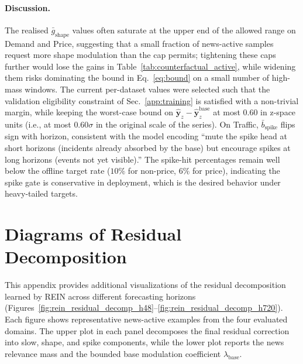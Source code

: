 \documentclass{article}
\newcommand{\method}{REIN\xspace}
\begin{document}
\paragraph{Discussion.}
The realised $\bar g_{\text{shape}}$ values often saturate at the upper end of the allowed range on Demand and Price, suggesting that a small fraction of news-active samples request more shape modulation than the cap permits; tightening these caps further would lose the gains in Table~\ref{tab:counterfactual_active}, while widening them risks dominating the bound in Eq.~\ref{eq:bound} on a small number of high-mass windows. The current per-dataset values were selected such that the validation eligibility constraint of Sec.~\ref{app:training} is satisfied with a non-trivial margin, while keeping the worst-case bound on $\hat{\bm y}_z{-}\hat{\bm y}^{\text{base}}_z$ at most $0.60$ in z-space units (i.e., at most $0.60\sigma$ in the original scale of the series). On Traffic, $\bar b_{\text{spike}}$ flips sign with horizon, consistent with the model encoding ``mute the spike head at short horizons (incidents already absorbed by the base) but encourage spikes at long horizons (events not yet visible).'' The spike-hit percentages remain well below the offline target rate ($10\%$ for non-price, $6\%$ for price), indicating the spike gate is conservative in deployment, which is the desired behavior under heavy-tailed targets.
\section{Diagrams of Residual Decomposition}
\label{app:res_diagrams}

This appendix provides additional visualizations of the residual decomposition learned by \method across different forecasting horizons (Figures~\ref{fig:rein_residual_decomp_h48}--\ref{fig:rein_residual_decomp_h720}). Each figure shows representative news-active examples from the four evaluated domains. The upper plot in each panel decomposes the final residual correction into slow, shape, and spike components, while the lower plot reports the news relevance mass and the bounded base modulation coefficient $\lambda_{\mathrm{base}}$.
\end{document}
